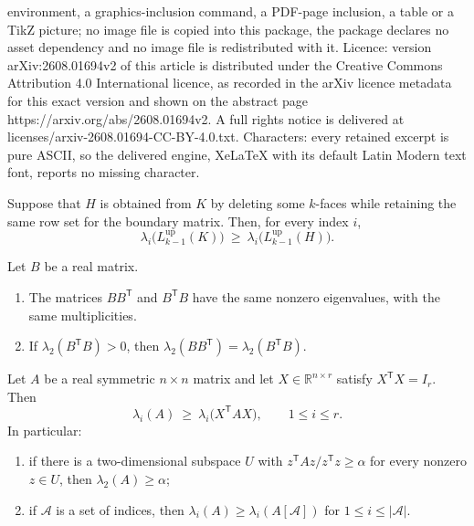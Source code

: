 \documentclass[10pt,a4paper]{amsart}
\newcommand{\Aset}{\mathcal A}
\newcommand{\Lup}{L^{\mathrm{up}}}
\newcommand{\R}{\mathbb{R}}
\newcommand{\T}{\mathsf{T}}
\begin{document}
environment, a graphics-inclusion command, a PDF-page inclusion, a table or a TikZ picture; no image file is copied into this package, the package declares no asset dependency and no image file is redistributed with it. Licence: version arXiv:2608.01694v2 of this article is distributed under the Creative Commons Attribution 4.0 International licence, as recorded in the arXiv licence metadata for this exact version and shown on the abstract page https://arxiv.org/abs/2608.01694v2. A full rights notice is delivered at licenses/arxiv-2608.01694-CC-BY-4.0.txt. Characters: every retained excerpt is pure ASCII, so the delivered engine, XeLaTeX with its default Latin Modern text font, reports no missing character.
\begin{lemma}\label{lem:deletion}
Suppose that $H$ is obtained from $K$ by deleting some $k$-faces while retaining the same row
set for the boundary matrix. Then, for every index $i$,
\[
  \lambda_i\bigl(\Lup_{k-1}(K)\bigr)\ \ge\ \lambda_i\bigl(\Lup_{k-1}(H)\bigr) .
\]
\end{lemma}

\begin{lemma}\label{lem:gram}
Let $B$ be a real matrix.
\begin{enumerate}[label=\textup{(\alph*)},leftmargin=2.6em]
\item The matrices $BB^{\T}$ and $B^{\T}B$ have the same nonzero eigenvalues,
with the same multiplicities.
\item\label{it:gram-b} If $\lambda_2(B^{\T}B)>0$, then $\lambda_2(BB^{\T})=\lambda_2(B^{\T}B)$.
\end{enumerate}
\end{lemma}

\begin{lemma}\label{lem:compress}
Let $A$ be a real symmetric $n\times n$ matrix and let $X\in\R^{n\times r}$ satisfy
$X^{\T}X=I_r$. Then
\[
  \lambda_i(A)\ \ge\ \lambda_i\bigl(X^{\T}AX\bigr),\qquad 1\le i\le r .
\]
In particular:
\begin{enumerate}[label=\textup{(\alph*)},leftmargin=2.6em]
\item\label{it:comp-a} if there is a two-dimensional subspace $U$ with
$z^{\T}Az/z^{\T}z\ge\alpha$ for every nonzero $z\in U$, then $\lambda_2(A)\ge\alpha$;
\item\label{it:comp-b} if $\Aset$ is a set of indices, then
$\lambda_i(A)\ge\lambda_i(A[\Aset])$ for $1\le i\le|\Aset|$.
\end{enumerate}
\end{lemma}
\end{document}
